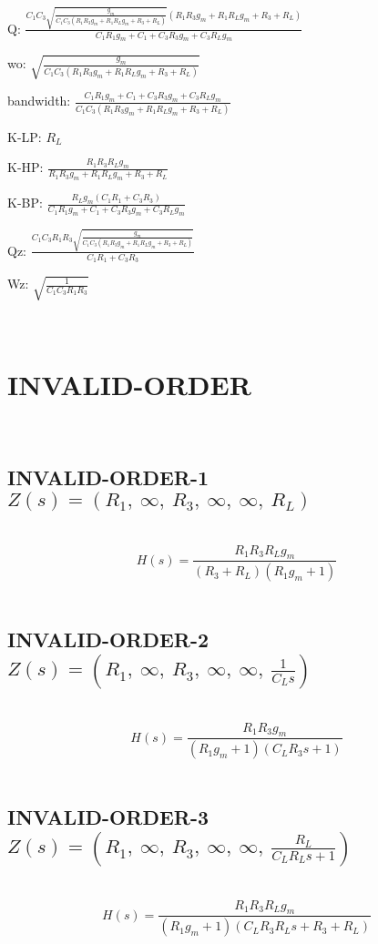 \documentclass{article}
\begin{document}
Q: $\frac{C_{1} C_{3} \sqrt{\frac{g_{m}}{C_{1} C_{3} \left(R_{1} R_{3} g_{m} + R_{1} R_{L} g_{m} + R_{3} + R_{L}\right)}} \left(R_{1} R_{3} g_{m} + R_{1} R_{L} g_{m} + R_{3} + R_{L}\right)}{C_{1} R_{1} g_{m} + C_{1} + C_{3} R_{3} g_{m} + C_{3} R_{L} g_{m}}$\ 

wo: $\sqrt{\frac{g_{m}}{C_{1} C_{3} \left(R_{1} R_{3} g_{m} + R_{1} R_{L} g_{m} + R_{3} + R_{L}\right)}}$\ 

bandwidth: $\frac{C_{1} R_{1} g_{m} + C_{1} + C_{3} R_{3} g_{m} + C_{3} R_{L} g_{m}}{C_{1} C_{3} \left(R_{1} R_{3} g_{m} + R_{1} R_{L} g_{m} + R_{3} + R_{L}\right)}$\ 

K-LP: $R_{L}$\ 

K-HP: $\frac{R_{1} R_{3} R_{L} g_{m}}{R_{1} R_{3} g_{m} + R_{1} R_{L} g_{m} + R_{3} + R_{L}}$\ 

K-BP: $\frac{R_{L} g_{m} \left(C_{1} R_{1} + C_{3} R_{3}\right)}{C_{1} R_{1} g_{m} + C_{1} + C_{3} R_{3} g_{m} + C_{3} R_{L} g_{m}}$\ 

Qz: $\frac{C_{1} C_{3} R_{1} R_{3} \sqrt{\frac{g_{m}}{C_{1} C_{3} \left(R_{1} R_{3} g_{m} + R_{1} R_{L} g_{m} + R_{3} + R_{L}\right)}}}{C_{1} R_{1} + C_{3} R_{3}}$\ 

Wz: $\sqrt{\frac{1}{C_{1} C_{3} R_{1} R_{3}}}$\ 

\ 

\section{INVALID-ORDER}\ 
\subsection{INVALID-ORDER-1 $Z(s) = \left( R_{1}, \  \infty, \  R_{3}, \  \infty, \  \infty, \  R_{L}\right)$ } \ 
\textbf{\[H(s) = \frac{R_{1} R_{3} R_{L} g_{m}}{\left(R_{3} + R_{L}\right) \left(R_{1} g_{m} + 1\right)}\] } \ 
\subsection{INVALID-ORDER-2 $Z(s) = \left( R_{1}, \  \infty, \  R_{3}, \  \infty, \  \infty, \  \frac{1}{C_{L} s}\right)$ } \ 
\textbf{\[H(s) = \frac{R_{1} R_{3} g_{m}}{\left(R_{1} g_{m} + 1\right) \left(C_{L} R_{3} s + 1\right)}\] } \ 
\subsection{INVALID-ORDER-3 $Z(s) = \left( R_{1}, \  \infty, \  R_{3}, \  \infty, \  \infty, \  \frac{R_{L}}{C_{L} R_{L} s + 1}\right)$ } \ 
\textbf{\[H(s) = \frac{R_{1} R_{3} R_{L} g_{m}}{\left(R_{1} g_{m} + 1\right) \left(C_{L} R_{3} R_{L} s + R_{3} + R_{L}\right)}\] } \ 
\end{document}
